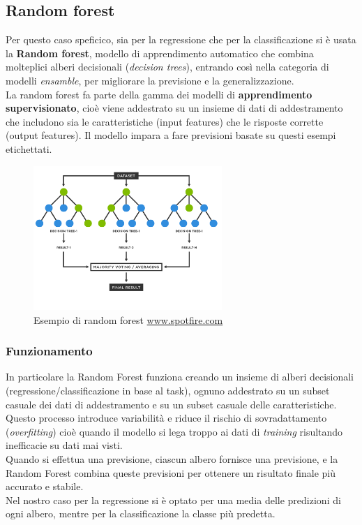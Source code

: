 \documentclass[italian,12pt,a4paper]{article}
\begin{document}
	\subsection{Random forest}
	Per questo caso speficico, sia per la regressione che per la classificazione si è usata la \textbf{Random forest}, modello di apprendimento automatico che combina molteplici alberi decisionali (\textit{decision trees}), entrando così nella categoria di modelli \textit{ensamble}, per migliorare la previsione e la generalizzazione.\\
	La random forest fa parte della gamma dei modelli di \textbf{apprendimento supervisionato}, cioè viene addestrato su un insieme di dati di addestramento che includono sia le caratteristiche (input features) che le risposte corrette (output features). 
	Il modello impara a fare previsioni basate su questi esempi etichettati.
		
	\begin{figure}[!h]
		\centering
		\includegraphics[width=270px]{img/random-forest-diagram}
		\caption{Esempio di random forest \href{https://www.spotfire.com/glossary/what-is-a-random-forest}{www.spotfire.com}}
	\end{figure}

	\subsubsection{Funzionamento}
	In particolare la Random Forest funziona creando un insieme di alberi decisionali (regressione/classificazione in base al task), ognuno addestrato su un subset casuale dei dati di addestramento e su un subset casuale delle caratteristiche.\\
	Questo processo introduce variabilità e riduce il rischio di sovradattamento (\textit{overfitting}) cioè quando il modello si lega troppo ai dati di \textit{training} risultando inefficacie su dati mai visti.\\ Quando si effettua una previsione, ciascun albero fornisce una previsione, e la Random Forest combina queste previsioni per ottenere un risultato finale più accurato e stabile.\\
	\linebreak
	Nel nostro caso per la regressione si è optato per una media delle predizioni di ogni albero, mentre per la classificazione la classe più predetta.
\end{document}
